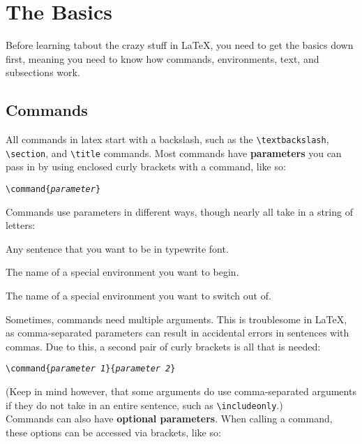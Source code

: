 \section{The Basics}
Before learning tabout the crazy stuff in \LaTeX{}, you need to get the basics down first, meaning you need to know how commands, environments, text, and subsections work.

\subsection{Commands}
All commands in latex start with a backslash, such as the \texttt{\textbackslash textbackslash}, \texttt{\textbackslash section}, and \texttt{\textbackslash title} commands. Most commands have \textbf{parameters} you can pass in by using enclosed curly brackets with a command, like so:

\begin{center}
\texttt{\textbackslash command\{\textit{parameter}\}}
\end{center}

Commands use parameters in different ways, though nearly all take in a string of letters:

\begin{description}
\centering
\item[\texttt{\textbackslash texttt}] Any sentence that you want to be in typewrite font.
\item[\texttt{\textbackslash begin}] The name of a special environment you want to begin. 
\item[\texttt{\textbackslash end}] The name of a special environment you want to switch out of. 
\end{description}

Sometimes, commands need multiple arguments. This is troublesome in \LaTeX, as comma-separated parameters can result in accidental errors in sentences with commas. Due to this, a second pair of curly brackets is all that is needed: 

\begin{center}
\texttt{\textbackslash command\{\textit{parameter 1}\}\{\textit{parameter 2}\}}
\end{center}

(Keep in mind however, that some arguments do use comma-separated arguments if they do not take in an entire sentence, such as \texttt{\textbackslash includeonly}.)\\

Commands can also have \textbf{optional parameters}. When calling a command, these options can be accessed via brackets, like so:

